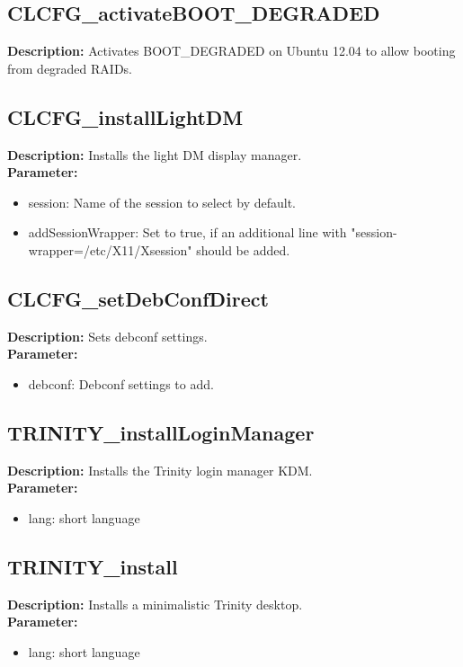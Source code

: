 \subsection{CLCFG\_activateBOOT\_DEGRADED}
\textbf{Description:} Activates BOOT\_DEGRADED on Ubuntu 12.04 to allow booting from degraded RAIDs.\\

\subsection{CLCFG\_installLightDM}
\textbf{Description:} Installs the light DM display manager.\\
\textbf{Parameter:}
\begin{itemize}
\item session: Name of the session to select by default.
\item addSessionWrapper: Set to true, if an additional line with "session-wrapper=/etc/X11/Xsession" should be added.
\end{itemize}

\subsection{CLCFG\_setDebConfDirect}
\textbf{Description:} Sets debconf settings.\\
\textbf{Parameter:}
\begin{itemize}
\item debconf: Debconf settings to add.
\end{itemize}

\subsection{TRINITY\_installLoginManager}
\textbf{Description:} Installs the Trinity login manager KDM.\\
\textbf{Parameter:}
\begin{itemize}
\item lang: short language
\end{itemize}

\subsection{TRINITY\_install}
\textbf{Description:} Installs a minimalistic Trinity desktop.\\
\textbf{Parameter:}
\begin{itemize}
\item lang: short language
\end{itemize}

